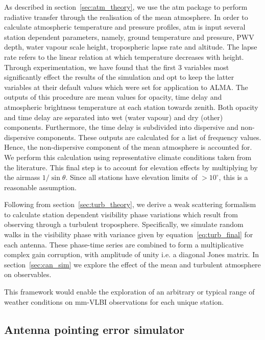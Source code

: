 As described in section~\ref{sec:atm_theory}, we use the {\sc atm} package to perform radiative transfer through the realisation of the mean atmosphere. 
In order to calculate atmospheric temperature and pressure profiles, {\sc atm} is input several station dependent parameters, namely, ground temperature and pressure, PWV depth, water vapour scale height, tropospheric lapse rate  and altitude. The lapse rate refers to the linear relation at which temperature decreases with height. Through experimentation, we have found that the first 3 variables most significantly effect the results of the simulation and opt to keep the latter variables at their default values which were set for application to ALMA. 
The outputs of this procedure are mean values for opacity, time delay and atmospheric brightness temperature at each station towards zenith. Both opacity and time delay are separated into wet (water vapour) and dry (other) components. Furthermore, the time delay is subdivided into dispersive and non-dispersive components. These outputs are calculated for a list of frequency values. Hence, the non-dispersive component of the mean atmosphere is accounted for.
We perform this calculation using representative climate conditions taken from the literature. This final step is to account for elevation effects by multiplying by the airmass $1/\sin\theta$. Since all stations have elevation limits of $>10^\circ$, this is a reasonable assumption.

Following from section~\ref{sec:turb_theory}, we derive a weak scattering formalism to calculate station dependent visibility phase variations which result from observing through a turbulent troposphere. Specifically, we simulate random walks in the visibility phase with variance given by equation~\ref{eq:turb_final} for each antenna. These phase-time series are combined to form a multiplicative complex gain corruption, with amplitude of unity i.e. a diagonal Jones matrix. In section~\ref{sec:can_sim} we explore the effect of the mean and turbulent atmosphere on observables.


This framework would enable the exploration of an arbitrary or typical range of weather conditions on mm-VLBI observations for each unique station.

\subsection{Antenna pointing error simulator}\label{sec:point_imp}

